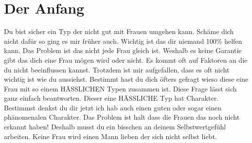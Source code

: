 \chapter{Der Anfang}

Du bist sicher ein Typ der nicht gut mit Frauen umgehen kann. Schäme dich nicht dafür so ging es mir früher auch. Wichtig ist das dir niemand 100\% helfen kann. Das Problem ist das nicht jede Frau gleich ist. Weshalb es keine Garantie gibt das dich eine Frau mögen wird oder nicht. Es kommt oft auf Faktoren an die du nicht beeinflussen kannst. Trotzdem ist mir aufgefallen, dass es oft nicht wichtig ist wie du aussiehst. Bestimmt hast du dich öfters gefragt wieso diese eine Frau mit so einem HÄSSLICHEN Typen zusammen ist. Diese Frage lässt sich ganz einfach beantworten. Dieser eine HÄSSLICHE Typ hat Charakter. Bestimmst denkst du dir jetzt ich hab auch einen guten oder sogar einen phänomenalen Charakter. Das Problem ist halt dass die Frauen das noch nicht erkannt haben! Deshalb musst du ein bisschen an deinem Selbstwertgefühl arbeiten. Keine Frau wird einen Mann lieben der sich nicht selbst liebt. 